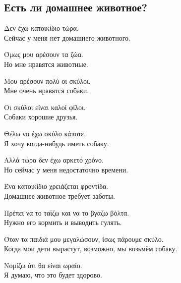 \documentclass[12pt]{article}
\newcommand{\my}[1]{\textcolor{gray!80!white}{#1}}
\newenvironment{page}{\clearpage\normalsize\null\vfill}{\vfill\null}
\newenvironment{textblock}{\begin{minipage}{\textwidth}}{\end{minipage}\smallskip}
\begin{document}
	\begin{page}
		\subsection{Есть ли домашнее животное?}
		\small
		\begin{textblock}
			Δεν έχω κατοικίδιο τώρα.\\
			\my{Сейчас у меня нет домашнего животного.}
			
			Όμως μου αρέσουν τα ζώα.\\
			\my{Но мне нравятся животные.}
			
			Μου αρέσουν πολύ οι σκύλοι.\\
			\my{Мне очень нравятся собаки.}
			
			Οι σκύλοι είναι καλοί φίλοι.\\
			\my{Собаки хорошие друзья.}
			
			Θέλω να έχω σκύλο κάποτε.\\
			\my{Я хочу когда-нибудь иметь собаку.}
			
			Αλλά τώρα δεν έχω αρκετό χρόνο.\\
			\my{Но сейчас у меня недостаточно времени.}
			
			Ένα κατοικίδιο χρειάζεται φροντίδα.\\
			\my{Домашнее животное требует заботы.}
			
			Πρέπει να το ταΐζω και να το βγάζω βόλτα.\\
			\my{Нужно его кормить и выводить гулять.}
			
			Όταν τα παιδιά μου μεγαλώσουν, ίσως πάρουμε σκύλο.\\
			\my{Когда мои дети вырастут, возможно, мы возьмём собаку.}
			
			Νομίζω ότι θα είναι ωραίο.\\
			\my{Я думаю, что это будет здорово.}
		\end{textblock}
	\end{page}
	
\end{document}
